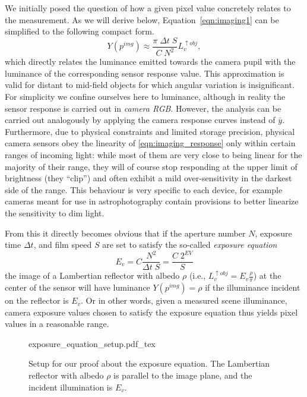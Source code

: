 We initially posed the question of how a given pixel value concretely
relates to the measurement. As we will derive below,
Equation~\eqref{eqn:imaging1} can be simplified to the following
compact form.
\begin{equation}\label{eqn:imaging_response}
  Y(p^{img}) \approx \frac{ \pi\;\Delta t\;S}{C\; N^2} L_v^{\uparrow obj},
\end{equation}
which directly relates the luminance emitted towards the camera pupil
with the luminance of the corresponding sensor response value. This approximation
is valid for distant to mid-field objects for which angular variation
is insignificant. For simplicity we confine ourselves here to luminance, although in
reality the sensor response is carried out in \textit{camera RGB}. However, the
analysis can be carried out analogously by applying the camera
response curves instead of $\bar y$. Furthermore, due to physical
constraints and limited storage precision, physical camera sensors
obey the linearity of \eqref{eqn:imaging_response} only within certain
ranges of incoming light: while most of them are very close to being linear for the
majority of their range, they will of course stop responding at the upper limit of brightness (they ``clip'') and often exhibit a mild over-sensitivity in the darkest side of the range. This behaviour is very specific to each device, for example cameras meant for use in astrophotography contain provisions to better linearize the sensitivity to dim light.

From this it directly becomes obvious that if the aperture number $N$,
exposure time $\Delta t$, and film speed $S$ are set to satisfy the
so-called \emph{exposure equation}
\begin{equation}\label{eqn:imaging_Ev}
E_v = C \frac{N^2}{\Delta t\; S} = \frac{C\; 2^{EV}}S
\end{equation}
the image of a Lambertian reflector with albedo $\rho$ (i.e.,
$L_v^{\uparrow obj} = E_v \frac \rho \pi$) at the center of the sensor
will have luminance $Y(p^{img}) = \rho$ if the illuminance incident on
the reflector is $E_v$. Or in other words, given a measured scene
illuminance, camera exposure values chosen to satisfy the exposure
equation thus yields pixel values in a reasonable range.

\begin{figure}[t]
    \centering
    \def\svgwidth{0.9\linewidth}
    {exposure_equation_setup.pdf_tex}
    \caption{\label{fig:exposure_equation_setup}%
        Setup for our proof about the exposure equation. The Lambertian reflector with albedo $\rho$ is parallel to 
        the image plane, and the incident illumination is $E_v$. }
\end{figure}

